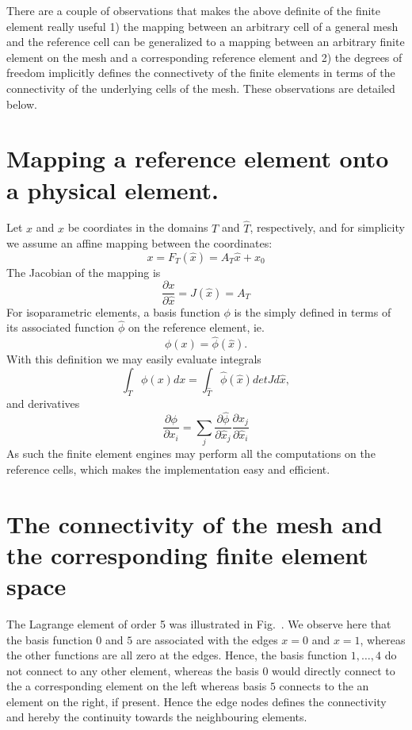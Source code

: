 There are a couple of observations that makes the above definite of the finite element really useful 1)   
the mapping between an arbitrary cell of a general mesh and the reference cell can be generalized to 
a mapping between an arbitrary finite element on the mesh and a corresponding reference element and 2)
the degrees of freedom implicitly defines the connectivety of the finite elements in terms of the
connectivity of the underlying cells of the mesh. These observations are detailed below.    

\section{Mapping a reference element onto a physical element. }
Let $x$ and $\hat{x}$ be coordiates in the domains $T$ and $\hat{T}$, respectively, and  
for simplicity we assume an affine mapping between the coordinates:  
\[
x = F_T(\hat{x}) = A_T \hat{x} + x_0   
\]
The Jacobian of the mapping is 
\[
\frac{\partial x}{\partial \hat{x}} = J(\hat{x}) = A_T      
\]
For isoparametric elements, a basis function $\phi$
is the simply defined in terms of its associated function $\hat{\phi}$
on the reference
element, ie. 
\[
\phi(x) = \hat{\phi}(\hat{x}) .  
\]
With this definition we may easily evaluate integrals
\[
\int_T \phi(x) dx = \int_{\hat{T}} \hat{\phi}(\hat{x}) det J d\hat{x},  
\]
and derivatives 
\[
\frac{\partial \phi}{\partial x_i } = \sum_j  \frac{\partial \hat{\phi}}{\partial \hat{x}_j } \frac{\partial \hat{x}_j}{\partial \hat{x}_i } 
\]
As such the finite element engines may perform all the computations on the reference cells, which makes the implementation easy and efficient. 

\section{The connectivity of the mesh and the corresponding finite element space}

The Lagrange element of order 5 was illustrated in Fig.~\cite{fig:Lagrange}. We observe here that the basis function $0$ and $5$ are associated
with the edges $x=0$ and $x=1$, whereas the other functions are all zero at the edges. Hence, the basis function $1, \ldots, 4$ do not connect 
to any other element, whereas the basis $0$ would directly connect to the a corresponding element on the left whereas basis $5$ connects to the 
an element on the right, if present. Hence the edge nodes defines the connectivity and hereby the continuity towards the neighbouring elements. 



